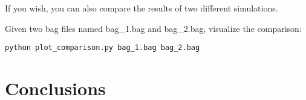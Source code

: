 \documentclass[11pt,a4paper]{article}
\begin{document}
If you wish, you can also compare the results of two different simulations.

Given two bag files named bag\_1.bag and bag\_2.bag, visualize the comparison:
\begin{lstlisting}
python plot_comparison.py bag_1.bag bag_2.bag
\end{lstlisting}



\section{Conclusions}
\end{document}
